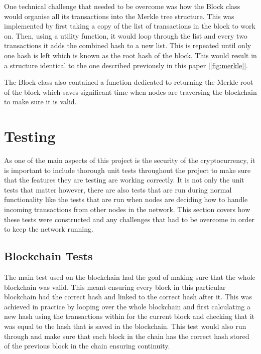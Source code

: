 \documentclass{l4proj}
\begin{document}
One technical challenge that needed to be overcome was how the Block class would organise all its transactions
into the Merkle tree structure. This was implemented by first taking a copy of the list of transactions in the
block to work on. Then, using a utility function, it would loop through the list and every two transactions it 
adds the combined hash to a new list. This is repeated until only one hash is left which is known as the root 
hash of the block. This would result in a structure identical to the one described previously in this paper
[\ref{fig:merkle}].


The Block class also contained a function dedicated to returning the Merkle root of the block which saves 
significant time when nodes are traversing the blockchain to make sure it is valid.

\section{Testing}
As one of the main aspects of this project is the security of the cryptocurrency, it is important to include
thorough unit tests throughout the project to make sure that the features they are testing are working correctly.
It is not only the unit tests that matter however, there are also tests that are run during normal functionality
like the tests that are run when nodes are deciding how to handle incoming transactions from other nodes in the
network. This section covers how these tests were constructed and any challenges that had to be overcome in order
to keep the network running.

\subsection{Blockchain Tests}
The main test used on the blockchain had the goal of making sure that the whole blockchain was valid. This meant
ensuring every block in this particular blockchain had the correct hash and linked to the correct hash after it.
This was achieved in practice by looping over the whole blockchain and first calculating a new hash using the 
transactions within for the current block and checking that it was equal to the hash that is saved in the 
blockchain. This test would also run through and make sure that each block in the chain has the correct hash
stored of the previous block in the chain ensuring continuity.
\end{document}
